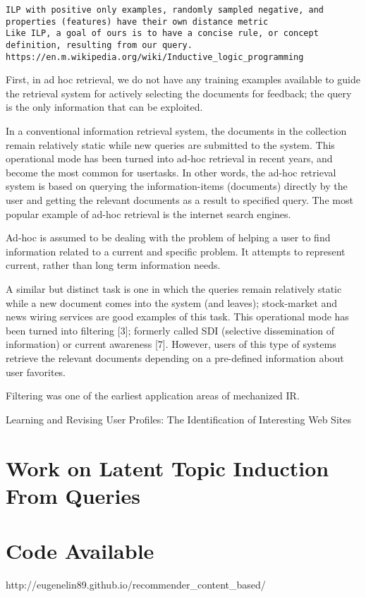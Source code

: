 \documentclass[14pt]{article}
\begin{document}
\begin{verbatim}
ILP with positive only examples, randomly sampled negative, and properties (features) have their own distance metric
Like ILP, a goal of ours is to have a concise rule, or concept definition, resulting from our query.
https://en.m.wikipedia.org/wiki/Inductive_logic_programming
\end{verbatim}

 First, in ad hoc retrieval, we do not have any training examples
available to guide the retrieval system for actively selecting
the documents for feedback; the query is the only information that
can be exploited.


In a conventional information retrieval system,
the documents in the collection remain relatively static
while new queries are submitted to the system. This
operational mode has been turned into ad-hoc retrieval
in recent years, and become the most common for usertasks.
In other words, the ad-hoc retrieval system is
based on querying the information-items (documents)
directly by the user and getting the relevant documents
as a result to specified query. The most popular example
of ad-hoc retrieval is the internet search engines.

Ad-hoc is assumed to be dealing with the
problem of helping a user to find information related to
a current and specific problem. It attempts to represent
current, rather than long term information needs.

 A similar but distinct task is one in which the
queries remain relatively static while a new document
comes into the system (and leaves); stock-market and
news wiring services are good examples of this task.
This operational mode has been turned into filtering [3];
formerly called SDI (selective dissemination of
information) or current awareness [7]. However, users
of this type of systems retrieve the relevant documents
depending on a pre-defined information about user favorites.

Filtering was one of the earliest application areas
of mechanized IR.


Learning and Revising User Profiles: The Identification of Interesting Web Sites

\section{Work on Latent Topic Induction
  From Queries}
\label{sec:latent-topic}

\section{Code Available}
\label{sec:code-available}
http://eugenelin89.github.io/recommender_content_based/
\end{document}

